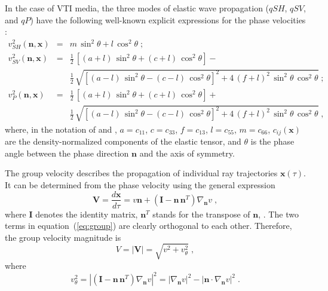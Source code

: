 In the case of VTI media, the three modes of elastic wave propagation
($qSH$, $qSV$, and $qP$) have the following well-known explicit
expressions for the phase velocities \cite[]{gassmann}:
\begin{eqnarray}
  \label{eq:qsh}
  v_{SH}^2(\mathbf{n},\mathbf{x}) & = & 
  m\,\sin^2{\theta} + l\,\cos^2{\theta}\;; \\
  \nonumber
  v^2_{SV}(\mathbf{n},\mathbf{x}) & = &
  \frac{1}{2}\,\left[(a+l)\,\sin^2{\theta} + (c+l)\,\cos^2{\theta}\right] -  \\
  & & \frac{1}{2}\,\sqrt{\left[(a-l)\,\sin^2{\theta} - 
      (c-l)\,\cos^2{\theta}\right]^2 +
      4\,(f+l)^2\,\sin^2{\theta}\,\cos^2{\theta}}\;; 
  \label{eq:qsv} \\
  \nonumber
  v^2_{P}(\mathbf{n},\mathbf{x}) & = &
  \frac{1}{2}\,\left[(a+l)\,\sin^2{\theta} + (c+l)\,\cos^2{\theta}\right] +  \\
  & & \frac{1}{2}\,\sqrt{\left[(a-l)\,\sin^2{\theta} - (c-l)\,\cos^2{\theta}\right]^2 +
      4\,(f+l)^2\,\sin^2{\theta}\,\cos^2{\theta}}\;,
    \label{eq:qp}
\end{eqnarray}
where, in the notation of \cite{backus} and \cite{GEO44-05-08960917},
$a=c_{11}$, $c=c_{33}$, $f=c_{13}$, $l=c_{55}$, $m=c_{66}$, $c_{ij}(\mathbf{x})$
are the density-normalized components of the elastic tensor, and $\theta$ is
the phase angle between the phase direction $\mathbf{n}$ and the axis of
symmetry.
  
The group velocity describes the propagation of individual ray trajectories
$\mathbf{x}(\tau)$.  It can be determined from the phase velocity using the
general expression
\begin{equation}
  \mathbf{V} = \frac{d \mathbf{x}}{d \tau} =
  v \mathbf{n} + \left(\mathbf{I} - \mathbf{n}\, \mathbf{n}^T\right) 
  \nabla_{\mathbf{n}} v\;,
  \label{eq:group}
\end{equation}
where $\mathbf{I}$ denotes the identity matrix, $\mathbf{n}^T$ stands for the
transpose of $\mathbf{n}$, . The two terms in
equation~(\ref{eq:group}) are clearly orthogonal to each other. Therefore, the
group velocity magnitude is
\cite[]{GEO20-04-07800806,GEO44-05-08960917,GEO49-11-19081914}
\begin{equation}
  \label{eq:f}
  V = |\mathbf{V}| = \sqrt{v^2 + v_{\theta}^2}\;,
\end{equation}
where 
\begin{equation}
  \label{eq:falpha}
  v_{\theta}^2 =  \left|\left(\mathbf{I} - \mathbf{n}\,
      \mathbf{n}^T\right) \nabla_{\mathbf{n}} v\right|^2 =
  \left|\nabla_{\mathbf{n}} v\right|^2 - 
  \left|\mathbf{n} \cdot \nabla_{\mathbf{n}} v\right|^2\;.
\end{equation}


